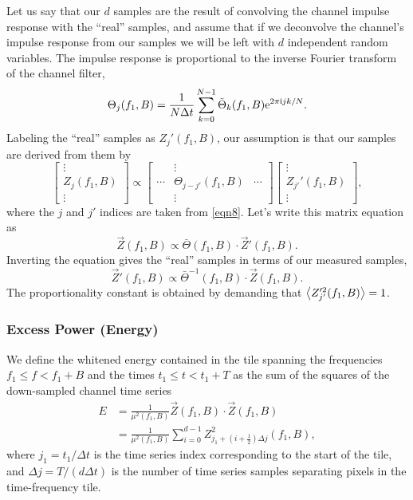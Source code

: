 \documentclass[10pt]{article}
\begin{document}
Let us say that our \(d\) samples are the result of convolving the channel
impulse response with the ``real'' samples, and assume that if we
deconvolve the channel's impulse response from our samples we will be left
with \(d\) independent random variables.  The impulse response is
proportional to the inverse Fourier transform of the channel filter,
\begin{equation}
\Theta_{j}(f_{1}, B)
   = \frac{1}{N \Delta t} \sum_{k = 0}^{N - 1} \tilde{\Theta}_{k}(f_{1}, B)
   \mathrm{e}^{2 \pi \mathrm{i} j k / N}.
\end{equation}
Labeling the ``real'' samples as \(Z_{j}'(f_{1}, B)\), our assumption is
that our samples are derived from them by
\begin{equation}
\begin{bmatrix}
\vdots \\
Z_{j}(f_{1}, B) \\
\vdots
\end{bmatrix}
   \propto \begin{bmatrix}
   & \vdots & \\
   \cdots & \Theta_{j - j'}(f_{1}, B) & \cdots \\
   & \vdots &
   \end{bmatrix}
   \begin{bmatrix}
   \vdots \\
   Z_{j'}'(f_{1}, B) \\
   \vdots
   \end{bmatrix},
\end{equation}
where the \(j\) and \(j'\) indices are taken from \eqref{eqn8}.  Let's
write this matrix equation as
\begin{equation}
\vec{Z}(f_{1}, B)
   \propto \bar{\Theta}(f_{1}, B) \cdot \vec{Z}'(f_{1}, B).
\end{equation}
Inverting the equation gives the ``real'' samples in terms of our measured
samples,
\begin{equation}
\vec{Z}'(f_{1}, B)
   \propto \bar{\Theta}^{-1}(f_{1}, B) \cdot \vec{Z}(f_{1}, B).
\end{equation}
The proportionality constant is obtained by demanding that
\(\left\langle Z_{j'}'^{2}(f_{1}, B)\right\rangle = 1\).


\subsubsection{Excess Power (Energy)}


We define the whitened energy contained in the tile spanning the
frequencies \(f_{1} \leq f < f_{1} + B\) and the times \(t_{1} \leq t <
t_{1} + T\) as the sum of the squares of the down-sampled channel time
series
\begin{align}
E
   & = \frac{1}{\mu^{2}(f_{1}, B)} \vec{Z}(f_{1}, B) \cdot \vec{Z}(f_{1},
   B)
   \\
\label{eqn6}
   & = \frac{1}{\mu^{2}(f_{1}, B)} \sum_{i = 0}^{d - 1} Z_{j_{1} + (i +
   \frac{1}{2}) \Delta j}^{2}(f_{1}, B),
\end{align}
where \(j_{1} = t_{1} / \Delta t\) is the time series index corresponding
to the start of the tile, and \(\Delta j = T / (d \Delta t)\) is the number
of time series samples separating pixels in the time-frequency tile.
\end{document}
